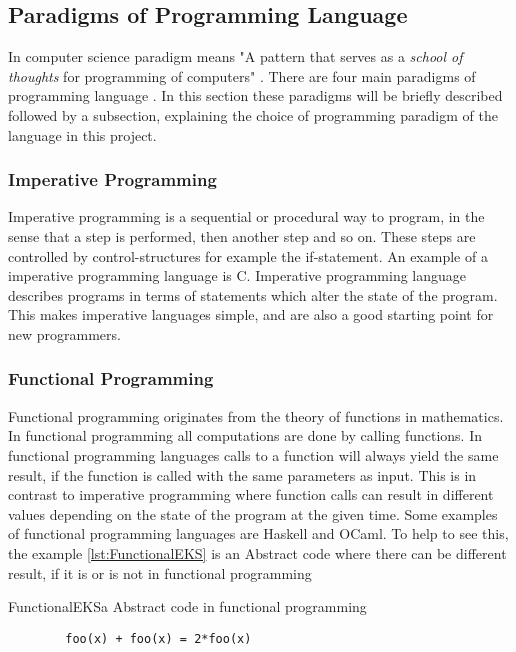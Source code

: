\subsection{Paradigms of Programming Language}
In computer science %
paradigm means "A pattern that serves as a \textit{school of thoughts} for programming of computers" \citep{ProgrammingParadigms2}. %
There are four main paradigms of programming language \citep{ProgrammingParadigms}. In this section these paradigms will be briefly described followed by a subsection, explaining the choice of programming paradigm of the language in this project.

\subsubsection{Imperative Programming}
Imperative programming is a sequential or procedural way to program, in the sense that a step is performed, then another step and so on. These steps are controlled by control-structures for example the if-statement. An example of a imperative programming language is C. Imperative programming language describes programs in terms of statements which alter the state of the program. This makes imperative languages simple, and are also a good starting point for new programmers.


\subsubsection{Functional Programming}
Functional programming originates from the theory of functions in mathematics. In functional programming all computations are done by calling functions. In functional programming languages calls to a function will always yield the same result, if the function is called with the same parameters as input. This is in contrast to imperative programming where function calls can result in different values depending on the state of the program at the given time. Some examples of functional programming languages are Haskell and OCaml. %
To help to see this, the example \ref{lst:FunctionalEKS} is an Abstract code where there can be different result, if it is or is not in functional programming

\begin{code}{FunctionalEKS}{a Abstract code in functional programming}
	\begin{lstlisting}
		foo(x) + foo(x) = 2*foo(x)
	\end{lstlisting}
\end{code}

